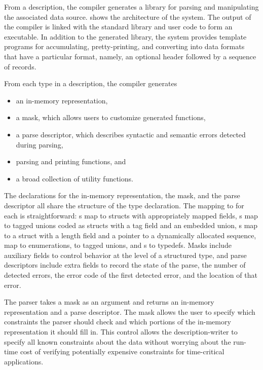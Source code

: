 From a description, the \pads{} compiler generates a \C{} library
for parsing and manipulating the associated data source.  
 shows the architecture of the \pads{}
system.  The output of the \pads{} compiler is linked with the \pads{}
standard library and user code to form an executable.
In addition to the generated library,
the \pads{} system provides template programs for accumulating, pretty-printing, and converting into \xml{} data formats that have a particular format, namely, an optional header followed by a sequence of records.

From each type in a \pads{} description, the compiler generates 
\begin{itemize}
\setlength{\itemsep}{0ex plus0.2ex}
\item an in-memory representation, 
\item a mask, which allows users to customize generated functions,
\item a parse descriptor, which describes syntactic and
semantic errors detected during parsing, 
\item parsing and printing functions, and 
\item a broad collection of utility functions.
\end{itemize}
%

The \C{} declarations for the in-memory representation, the mask, 
and the parse descriptor all share the structure of the \pads{}
type declaration.  The mapping to \C{} for each is straightforward: 
s map to \C{} structs with appropriately mapped fields, 
s map to tagged unions coded as \C{} structs with a tag field 
and an embedded 
union, s map to a \C{} struct with a length field and a
pointer
to a dynamically allocated sequence,  map to \C{}
enumerations,   
to tagged unions, and s to \C{} typedefs.  Masks include
auxiliary fields to control behavior at the level of a structured
type, and parse descriptors include extra fields to record the 
state of the parse, the number of detected errors, 
the error code of the first detected error, and the location of that error.

The parser takes a mask as an argument and returns an
in-memory representation and a parse descriptor.  
The mask allows the user to specify 
which constraints the parser should check and which portions of the
in-memory representation it should fill in.  This control allows the
description-writer to specify all known constraints about the data
without worrying about the run-time cost of verifying potentially
expensive constraints for time-critical applications.


